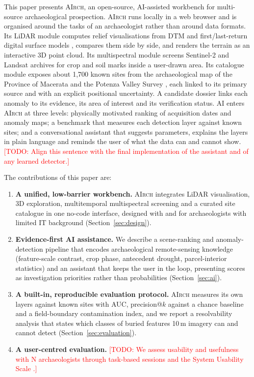 \documentclass[preprint,12pt,authoryear]{elsarticle}
\newcommand{\airch}{\textsc{AIrch}}
\newcommand{\todo}[1]{\textcolor{red}{[TODO: #1]}}
\begin{document}
This paper presents \airch{}, an open-source, AI-assisted workbench for multi-source archaeological prospection. \airch{} runs locally in a web browser and is organised around the tasks of an archaeologist rather than around data formats. Its LiDAR module computes relief visualisations from DTM and first/last-return digital surface models \citep{kokalj2016rvt}, compares them side by side, and renders the terrain as an interactive 3D point cloud. Its multispectral module screens Sentinel-2 and Landsat archives for crop and soil marks inside a user-drawn area. Its catalogue module exposes about 1,700 known sites from the archaeological map of the Province of Macerata \citep{perna2024camm} and the Potenza Valley Survey \citep{vermeulen2017pvs}, each linked to its primary source and with an explicit positional uncertainty. A candidate dossier links each anomaly to its evidence, its area of interest and its verification status. AI enters \airch{} at three levels: physically motivated ranking of acquisition dates and anomaly maps; a benchmark that measures each detection layer against known sites; and a conversational assistant that suggests parameters, explains the layers in plain language and reminds the user of what the data can and cannot show. \todo{Align this sentence with the final implementation of the assistant and of any learned detector.}

The contributions of this paper are:
\begin{enumerate}
  \item \textbf{A unified, low-barrier workbench.} \airch{} integrates LiDAR visualisation, 3D exploration, multitemporal multispectral screening and a curated site catalogue in one no-code interface, designed with and for archaeologists with limited IT background (Section~\ref{sec:design}).
  \item \textbf{Evidence-first AI assistance.} We describe a scene-ranking and anomaly-detection pipeline that encodes archaeological remote-sensing knowledge (feature-scale contrast, crop phase, antecedent drought, parcel-interior statistics) and an assistant that keeps the user in the loop, presenting scores as investigation priorities rather than probabilities (Section~\ref{sec:ai}).
  \item \textbf{A built-in, reproducible evaluation protocol.} \airch{} measures its own layers against known sites with AUC, precision@$k$ against a chance baseline and a field-boundary contamination index, and we report a resolvability analysis that states which classes of buried features 10\,m imagery can and cannot detect (Section~\ref{sec:evaluation}).
  \item \textbf{A user-centred evaluation.} \todo{We assess usability and usefulness with N archaeologists through task-based sessions and the System Usability Scale \citep{brooke1996sus}.}
\end{enumerate}
\end{document}

